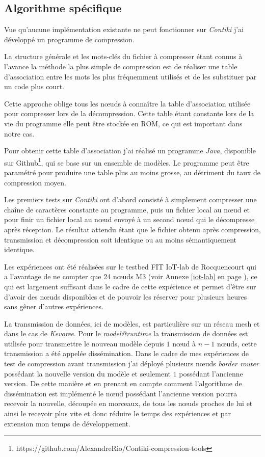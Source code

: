 \subsection{Algorithme spécifique}

Vue qu'aucune implémentation existante ne peut fonctionner sur \emph{Contiki} j'ai développé un programme de compression.

La structure générale et les mots-clés du fichier à compresser étant connus à l'avance la méthode la plus simple de compression est de réaliser une table d'association entre les mots les plus fréquemment utilisés et de les substituer par un code plus court.

Cette approche oblige tous les nœuds à connaître la table d'association utilisée pour compresser lors de la décompression. Cette table étant constante lors de la vie du programme elle peut être stockée en ROM, ce qui est important dans notre cas.

Pour obtenir cette table d'association j'ai réalisé un programme \emph{Java}, disponible sur Github\footnote{https://github.com/AlexandreRio/Contiki-compression-tools}, qui se base sur un ensemble de modèles. Le programme peut être paramétré pour produire une table plus au moins grosse, au détriment du taux de compression moyen.

Les premiers tests sur \emph{Contiki} ont d'abord consisté à simplement compresser une chaîne de caractères constante au programme, puis un fichier local au nœud et pour finir un fichier local au nœud envoyé à un second nœud qui le décompresse après réception. Le résultat attendu étant que le fichier obtenu après compression, transmission et décompression soit identique ou au moins sémantiquement identique.

Les expériences ont été réalisées sur le testbed FIT IoT-lab de Rocquencourt qui a l'avantage de ne compter que 24 nœuds M3 (voir Annexe \ref{iot-lab} en page \pageref{iot-lab}), ce qui est largement suffisant dans le cadre de cette expérience et permet d'être sur d'avoir des nœuds disponibles et de pouvoir les réserver pour plusieurs heures sans gêner d'autres expériences.

La transmission de données, ici de modèles, est particulière sur un réseau mesh et dans le cas de \emph{Kevoree}. Pour le \emph{model@runtime} la transmission de données est utilisée pour transmettre le nouveau modèle depuis $1$ nœud à $n-1$ nœuds, cette transmission a été appelée dissémination. Dans le cadre de mes expériences de test de compression avant transmission j'ai déployé plusieurs nœuds \emph{border router} possédant la nouvelle version du modèle et seulement $1$ possédant l'ancienne version. De cette manière et en prenant en compte comment l'algorithme de dissémination est implémenté le nœud possédant l'ancienne version pourra recevoir la nouvelle, découpée en morceaux, de tous les nœuds proches de lui et ainsi le recevoir plus vite et donc réduire le temps des expériences et par extension mon temps de développement.

